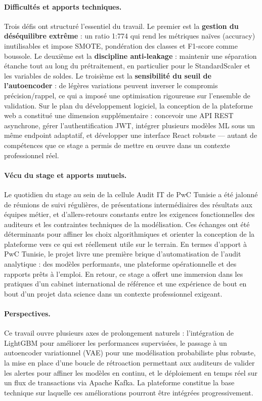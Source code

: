 \documentclass[12pt,a4paper,twoside]{report}
\begin{document}
\paragraph{Difficultés et apports techniques.} Trois défis ont structuré l'essentiel du travail. Le premier est la \textbf{gestion du déséquilibre extrême} : un ratio 1:774 qui rend les métriques naïves (accuracy) inutilisables et impose SMOTE, pondération des classes et F1-score comme boussole. Le deuxième est la \textbf{discipline anti-leakage} : maintenir une séparation étanche tout au long du prétraitement, en particulier pour le StandardScaler et les variables de soldes. Le troisième est la \textbf{sensibilité du seuil de l'autoencoder} : de légères variations peuvent inverser le compromis précision/rappel, ce qui a imposé une optimisation rigoureuse sur l'ensemble de validation. Sur le plan du développement logiciel, la conception de la plateforme web a constitué une dimension supplémentaire : concevoir une API REST asynchrone, gérer l'authentification JWT, intégrer plusieurs modèles ML sous un même endpoint adaptatif, et développer une interface React robuste — autant de compétences que ce stage a permis de mettre en œuvre dans un contexte professionnel réel.

\paragraph{Vécu du stage et apports mutuels.} Le quotidien du stage au sein de la cellule Audit IT de PwC Tunisie a été jalonné de réunions de suivi régulières, de présentations intermédiaires des résultats aux équipes métier, et d'allers-retours constants entre les exigences fonctionnelles des auditeurs et les contraintes techniques de la modélisation. Ces échanges ont été déterminants pour affiner les choix algorithmiques et orienter la conception de la plateforme vers ce qui est réellement utile sur le terrain. En termes d'apport à PwC Tunisie, le projet livre une première brique d'automatisation de l'audit analytique : des modèles performants, une plateforme opérationnelle et des rapports prêts à l'emploi. En retour, ce stage a offert une immersion dans les pratiques d'un cabinet international de référence et une expérience de bout en bout d'un projet data science dans un contexte professionnel exigeant.

\paragraph{Perspectives.} Ce travail ouvre plusieurs axes de prolongement naturels : l'intégration de LightGBM pour améliorer les performances supervisées, le passage à un autoencoder variationnel (VAE) pour une modélisation probabiliste plus robuste, la mise en place d'une boucle de rétroaction permettant aux auditeurs de valider les alertes pour affiner les modèles en continu, et le déploiement en temps réel sur un flux de transactions via Apache Kafka. La plateforme constitue la base technique sur laquelle ces améliorations pourront être intégrées progressivement.
\end{document}
